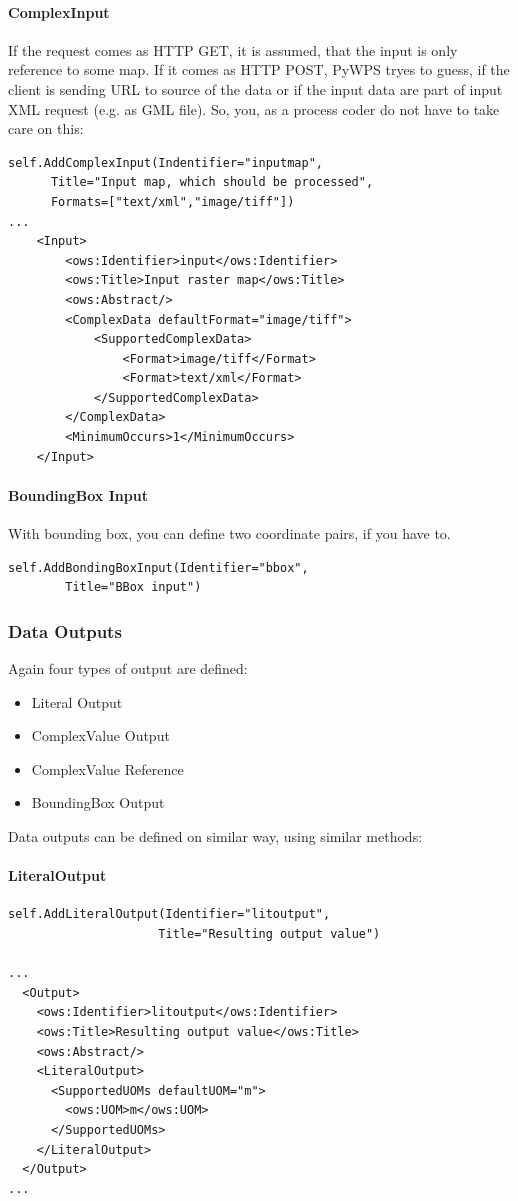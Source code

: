 \documentclass[a4paper,11pt]{article}
\begin{document}
\paragraph{ComplexInput}
If the request comes as HTTP GET, it is assumed, that the input is only
reference to some map. If it comes as HTTP POST, PyWPS tryes to guess, if
the client is sending URL to source of the data or if the input data are
part of input XML request (e.g. as GML file). So, you, as a process coder
do not have to take care on this:

\begin{verbatim}
self.AddComplexInput(Indentifier="inputmap",
      Title="Input map, which should be processed",
      Formats=["text/xml","image/tiff"])
...
    <Input>
        <ows:Identifier>input</ows:Identifier>
        <ows:Title>Input raster map</ows:Title>
        <ows:Abstract/>
        <ComplexData defaultFormat="image/tiff">
            <SupportedComplexData>
                <Format>image/tiff</Format>
                <Format>text/xml</Format>
            </SupportedComplexData>
        </ComplexData>
        <MinimumOccurs>1</MinimumOccurs>
    </Input>
\end{verbatim}

\paragraph{BoundingBox Input}
With bounding box, you can define two coordinate pairs, if you have to.

\begin{verbatim}
self.AddBondingBoxInput(Identifier="bbox",
        Title="BBox input")
\end{verbatim}

\subsubsection{Data Outputs}
Again four types of output are defined:
\begin{itemize}
    \item Literal Output
    \item ComplexValue Output
    \item ComplexValue Reference
    \item BoundingBox Output
\end{itemize}
    
Data outputs can be defined on similar way, using similar methods:

\paragraph{LiteralOutput}
\begin{verbatim}
self.AddLiteralOutput(Identifier="litoutput",
                     Title="Resulting output value")

...
  <Output>
    <ows:Identifier>litoutput</ows:Identifier>
    <ows:Title>Resulting output value</ows:Title>
    <ows:Abstract/>
    <LiteralOutput>
      <SupportedUOMs defaultUOM="m">
        <ows:UOM>m</ows:UOM>
      </SupportedUOMs>
    </LiteralOutput>
  </Output>
...
\end{verbatim}
\end{document}
